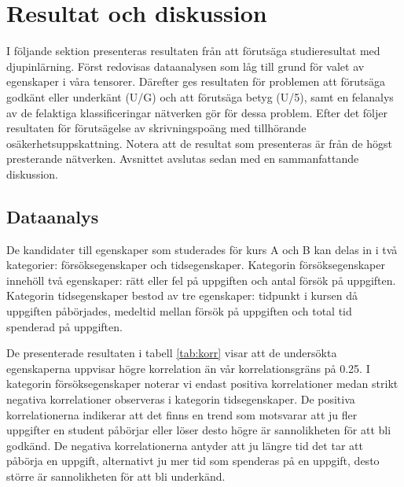 \section{Resultat och diskussion}
I följande sektion presenteras resultaten från att förutsäga studieresultat med djupinlärning. Först redovisas dataanalysen som låg till grund för valet av egenskaper i våra tensorer. Därefter ges resultaten för problemen att förutsäga godkänt eller underkänt (U/G) och att förutsäga betyg (U/5), samt en felanalys av de felaktiga klassificeringar nätverken gör för dessa problem. Efter det följer resultaten för förutsägelse av skrivningspoäng med tillhörande osäkerhetsuppskattning. Notera att de resultat som presenteras är från de högst presterande nätverken. Avsnittet avslutas sedan med en sammanfattande diskussion.

\subsection{Dataanalys}
\label{sec:dataanalysis}
De kandidater till egenskaper som studerades för kurs A och B kan delas in i två kategorier: försöksegenskaper och tidsegenskaper. Kategorin försöksegenskaper innehöll två egenskaper: rätt eller fel på uppgiften och antal försök på uppgiften. Kategorin tidsegenskaper bestod av tre egenskaper: tidpunkt i kursen då uppgiften påbörjades, medeltid mellan försök på uppgiften och total tid spenderad på uppgiften. 


De presenterade resultaten i tabell \ref{tab:korr} visar att de undersökta egenskaperna uppvisar högre korrelation än vår korrelationsgräns på 0.25. I kategorin försöksegenskaper noterar vi endast positiva korrelationer medan strikt negativa korrelationer observeras i kategorin tidsegenskaper. De positiva korrelationerna indikerar att det finns en trend som motsvarar att ju fler uppgifter en student påbörjar eller löser desto högre är sannolikheten för att bli godkänd. De negativa korrelationerna antyder att ju längre tid det tar att påbörja en uppgift, alternativt ju mer tid som spenderas på en uppgift, desto större är sannolikheten för att bli underkänd.


